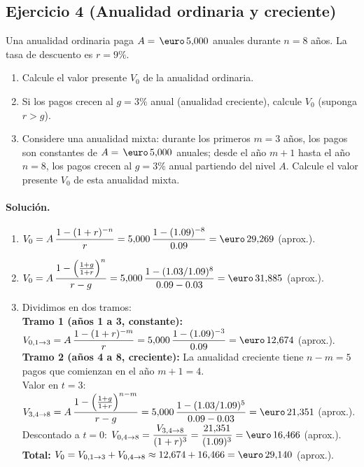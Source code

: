 \documentclass[12pt,a4paper]{article}
\newenvironment{ejercicio}[1]{\subsection*{Ejercicio #1}}{}
\newenvironment{solucion}{\paragraph{Solución.}}{}
\begin{document}
\begin{ejercicio}{4 (Anualidad ordinaria y creciente)}
Una anualidad ordinaria paga $A=\,\text{\euro}\,5{,}000$ anuales durante $n=8$ años. La tasa de descuento es $r=9\%$.
\begin{enumerate}[label=\alph*)]
  \item Calcule el valor presente $V_0$ de la anualidad ordinaria.
  \item Si los pagos crecen al $g=3\%$ anual (anualidad creciente), calcule $V_0$ (suponga $r>g$).
  \item Considere una anualidad mixta: durante los primeros $m=3$ años, los pagos son constantes de $A=\,\text{\euro}\,5{,}000$ anuales; desde el año $m+1$ hasta el año $n=8$, los pagos crecen al $g=3\%$ anual partiendo del nivel $A$. Calcule el valor presente $V_0$ de esta anualidad mixta.
\end{enumerate}
\end{ejercicio}
\begin{solucion}
\begin{enumerate}[label=\alph*)]
  \item $V_0=A\,\dfrac{1-(1+r)^{-n}}{r}=5{,}000\,\dfrac{1-(1.09)^{-8}}{0.09}=\text{\euro}\,29{,}269$ (aprox.).
  \item $V_0=A\,\dfrac{1-\left(\tfrac{1+g}{1+r}\right)^{n}}{r-g}=5{,}000\,\dfrac{1-(1.03/1.09)^8}{0.09-0.03}=\text{\euro}\,31{,}885$ (aprox.).
  \item Dividimos en dos tramos:\\
        \textbf{Tramo 1 (años 1 a 3, constante):} $V_{0, 1\to3}=A\,\dfrac{1-(1+r)^{-m}}{r}=5{,}000\,\dfrac{1-(1.09)^{-3}}{0.09}=\text{\euro}\,12{,}674$ (aprox.).\\
        \textbf{Tramo 2 (años 4 a 8, creciente):} La anualidad creciente tiene $n-m=5$ pagos que comienzan en el año $m+1=4$.\\
        Valor en $t=3$: $V_{3,4\to8}=A\,\dfrac{1-\left(\tfrac{1+g}{1+r}\right)^{n-m}}{r-g}=5{,}000\,\dfrac{1-(1.03/1.09)^5}{0.09-0.03}=\text{\euro}\,21{,}351$ (aprox.).\\
        Descontado a $t=0$: $V_{0,4\to8}=\dfrac{V_{3,4\to8}}{(1+r)^3}=\dfrac{21{,}351}{(1.09)^3}=\text{\euro}\,16{,}466$ (aprox.).\\
        \textbf{Total:} $V_0=V_{0, 1\to3}+V_{0,4\to8}\approx12{,}674+16{,}466=\text{\euro}\,29{,}140$ (aprox.).
\end{enumerate}
\end{solucion}
\end{document}
